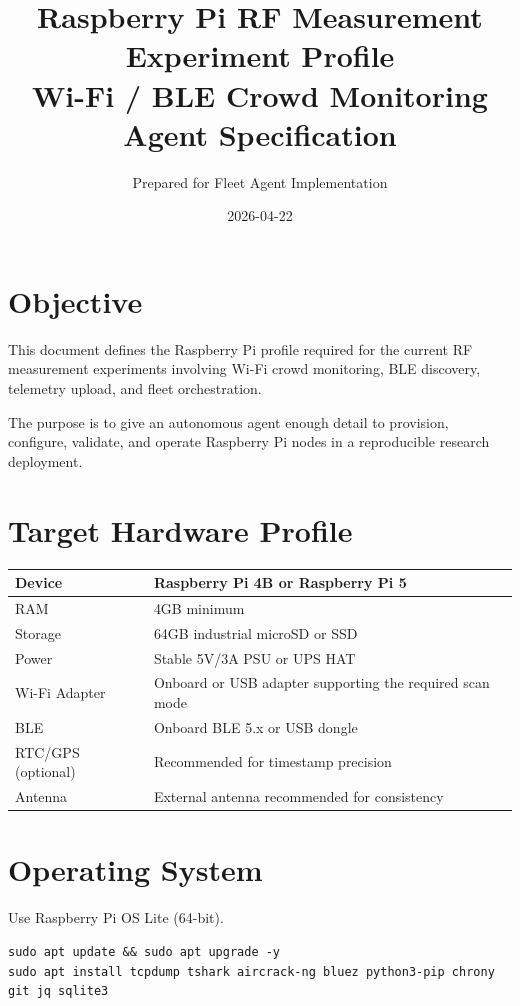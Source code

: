 \documentclass[11pt,a4paper]{article}
\title{Raspberry Pi RF Measurement Experiment Profile\\
Wi-Fi / BLE Crowd Monitoring Agent Specification}
\author{Prepared for Fleet Agent Implementation}
\date{2026-04-22}
\begin{document}
\maketitle

\section{Objective}

This document defines the Raspberry Pi profile required for the current RF measurement experiments involving Wi-Fi crowd monitoring, BLE discovery, telemetry upload, and fleet orchestration.

The purpose is to give an autonomous agent enough detail to provision, configure, validate, and operate Raspberry Pi nodes in a reproducible research deployment.

\section{Target Hardware Profile}

\begin{longtable}{|p{5cm}|p{9cm}|}
\hline
Device & Raspberry Pi 4B or Raspberry Pi 5 \\
\hline
RAM & 4GB minimum \\
\hline
Storage & 64GB industrial microSD or SSD \\
\hline
Power & Stable 5V/3A PSU or UPS HAT \\
\hline
Wi-Fi Adapter & Onboard or USB adapter supporting the required scan mode \\
\hline
BLE & Onboard BLE 5.x or USB dongle \\
\hline
RTC/GPS (optional) & Recommended for timestamp precision \\
\hline
Antenna & External antenna recommended for consistency \\
\hline
\end{longtable}

\section{Operating System}

Use Raspberry Pi OS Lite (64-bit).

\begin{lstlisting}
sudo apt update && sudo apt upgrade -y
sudo apt install tcpdump tshark aircrack-ng bluez python3-pip chrony git jq sqlite3
\end{lstlisting}
\end{document}

